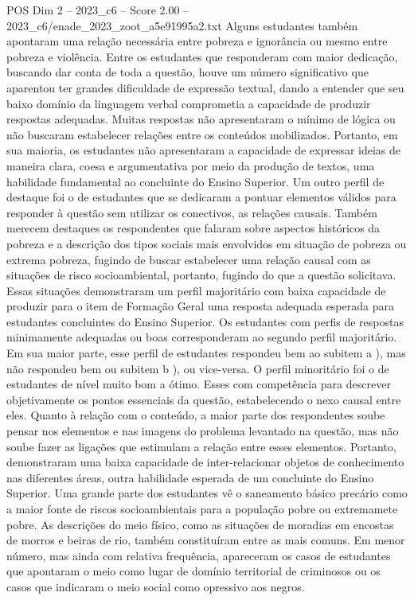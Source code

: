 \begin{textsample}{POS Dim 2 – 2023\_c6 – Score 2.00 – 2023\_c6/enade\_2023\_zoot\_a5e91995a2.txt}
Alguns estudantes também apontaram uma relação necessária entre pobreza e ignorância ou mesmo entre pobreza e violência.
Entre os estudantes que responderam com maior dedicação, buscando dar conta de toda a questão, houve um número significativo que aparentou ter grandes dificuldade de expressão textual, dando a entender que seu baixo domínio da linguagem verbal comprometia a capacidade de produzir respostas adequadas.
Muitas respostas não apresentaram o mínimo de lógica ou não buscaram estabelecer relações entre os conteúdos mobilizados.
Portanto, em sua maioria, os estudantes não apresentaram a capacidade de expressar ideias de maneira clara, coesa e argumentativa por meio da produção de textos, uma habilidade fundamental ao concluinte do Ensino Superior.
Um outro perfil de destaque foi o de estudantes que se dedicaram a pontuar elementos válidos para responder à questão sem utilizar os conectivos, as relações causais.
Também merecem destaques os respondentes que falaram sobre aspectos históricos da pobreza e a descrição dos tipos sociais mais envolvidos em situação de pobreza ou extrema pobreza, fugindo de buscar estabelecer uma relação causal com as situações de risco socioambiental, portanto, fugindo do que a questão solicitava.
Essas situações demonstraram um perfil majoritário com baixa capacidade de produzir para o item de Formação Geral uma resposta adequada esperada para estudantes concluintes do Ensino Superior.
Os estudantes com perfis de respostas minimamente adequadas ou boas corresponderam ao segundo perfil majoritário.
Em sua maior parte, esse perfil de estudantes respondeu bem ao subitem a ), mas não respondeu bem ou subitem b ), ou vice-versa.
O perfil minoritário foi o de estudantes de nível muito bom a ótimo.
Esses com competência para descrever objetivamente os pontos essenciais da questão, estabelecendo o nexo causal entre eles.
Quanto à relação com o conteúdo, a maior parte dos respondentes soube pensar nos elementos e nas imagens do problema levantado na questão, mas não soube fazer as ligações que estimulam a relação entre esses elementos.
Portanto, demonstraram uma baixa capacidade de inter-relacionar objetos de conhecimento nas diferentes áreas, outra habilidade esperada de um concluinte do Ensino Superior.
Uma grande parte dos estudantes vê o saneamento básico precário como a maior fonte de riscos socioambientais para a população pobre ou extremamete pobre.
As descrições do meio físico, como as situações de moradias em encostas de morros e beiras de rio, também constituíram entre as mais comuns.
Em menor número, mas ainda com relativa frequência, apareceram os casos de estudantes que apontaram o meio como lugar de domínio territorial de criminosos ou os casos que indicaram o meio social como opressivo aos negros.

\end{textsample}
